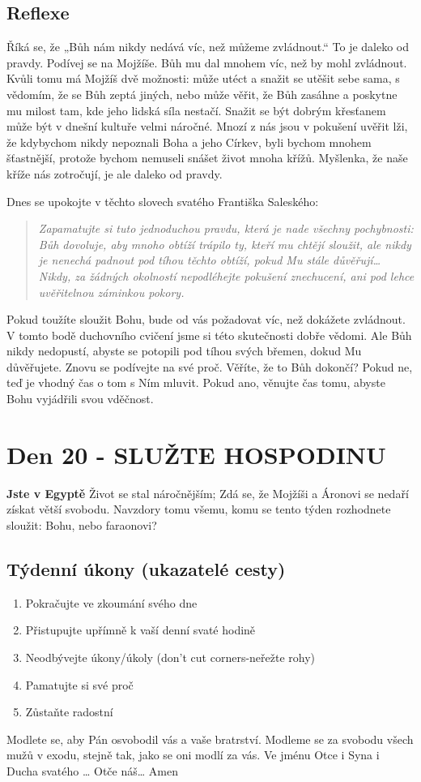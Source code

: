 \documentclass[11pt]{article}
\newcommand{\zacatekTretiTyden}{
  \textbf{Jste v Egyptě} \newline
  Život se stal náročnějším; Zdá se, že Mojžíši a Áronovi se nedaří získat větší svobodu. Navzdory tomu všemu,
komu se tento týden rozhodnete sloužit: Bohu, nebo faraonovi?

\subsection*{Týdenní úkony (ukazatelé cesty)}
\begin{enumerate}
  \item Pokračujte ve zkoumání svého dne
  \item Přistupujte upřímně k vaší denní svaté hodině
  \item Neodbývejte úkony/úkoly (don’t cut corners-neřežte rohy)
  \item Pamatujte si své proč
  \item Zůstaňte radostní
\end{enumerate}
Modlete se, aby Pán osvobodil vás a vaše bratrství. \newline
Modleme se za svobodu všech mužů v exodu, stejně tak, jako se oni modlí za vás.\newline
Ve jménu Otce i Syna i Ducha svatého …  Otče náš… Amen
}
\begin{document}
\subsection*{Reflexe}

Říká se, že „Bůh nám nikdy nedává víc, než můžeme zvládnout.“ To je daleko od pravdy. Podívej se na Mojžíše.
Bůh mu dal mnohem víc, než by mohl zvládnout. Kvůli tomu má Mojžíš dvě možnosti: může utéct a snažit se utěšit
sebe sama, s vědomím, že se Bůh zeptá jiných, nebo může věřit, že Bůh zasáhne a poskytne mu milost tam, kde
jeho lidská síla nestačí.
Snažit se být dobrým křesťanem může být v dnešní kultuře velmi náročné. Mnozí z nás jsou v pokušení uvěřit lži,
že kdybychom nikdy nepoznali Boha a jeho Církev, byli bychom mnohem šťastnější, protože bychom nemuseli
snášet život mnoha křížů. Myšlenka, že naše kříže nás zotročují, je ale daleko od pravdy.

\begin{minipage}{\dimexpr\textwidth-20pt}
  Dnes se upokojte v těchto slovech svatého Františka Saleského:
\begin{quote}
  \textit{Zapamatujte si tuto jednoduchou pravdu, která je nade všechny pochybnosti: Bůh dovoluje, aby mnoho obtíží trápilo ty, kteří mu chtějí sloužit, ale nikdy je nenechá padnout pod tíhou těchto obtíží, pokud Mu stále důvěřují… Nikdy, za žádných okolností nepodléhejte pokušení znechucení, ani pod lehce uvěřitelnou záminkou pokory.}
\end{quote}
\end{minipage}


Pokud toužíte sloužit Bohu, bude od vás požadovat víc, než dokážete zvládnout. V tomto bodě duchovního cvičení
jsme si této skutečnosti dobře vědomi. Ale Bůh nikdy nedopustí, abyste se potopili pod tíhou svých břemen, dokud
Mu důvěřujete. Znovu se podívejte na své proč. Věříte, že to Bůh dokončí? Pokud ne, teď je vhodný čas o tom
s Ním mluvit. Pokud ano, věnujte čas tomu, abyste Bohu vyjádřili svou vděčnost.

\newpage
\section{Den 20 - SLUŽTE HOSPODINU}
\zacatekTretiTyden
\end{document}
